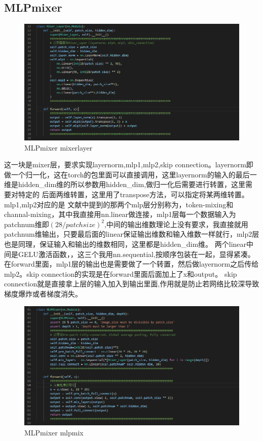 \documentclass{report}
\begin{document}
    \subsection{MLPmixer}
    \begin{figure}[H]
        \centering
        \includegraphics[width=15cm]{13.png}
        \caption{MLPmixer mixerlayer}
    \end{figure}
    这一块是mixer层，要求实现layernorm,mlp1,mlp2,skip connection。layernorm即做一个归一化，这在torch的包里面可以直接调用，这里layernorm的输入的最后一维是hidden\_dim维的所以参数用hidden\_dim,做归一化后需要进行转置，这里需要对特定的
    后面两维转置，这里用了transpose方法，可以指定将某两维转置。mlp1,mlp2对应的是
    文献中提到的那两个mlp层分别称为，token-mixing和channal-mixing，其中我直接用nn.linear做连接，mlp1层每一个数据输入为patchnum维即$(28/patchsize)^2$,中间的输出维数理论上没有要求，我直接就用patchnum维输出，只要最后面的linear保证输出维数和输入维数一样就行，mlp2层也是同理，保证输入和输出的维数相同，这里都是hidden\_dim维。
    两个linear中间是GELU激活函数，，这三个我用nn.sequential,按顺序包装在一起，显得紧凑。在forward里面，mlp1层的输出也是需要做了一个转置，然后做layernorm之后传给mlp2。skip connection的实现是在forward里面后面加上了x和output。
    skip connection就是直接拿上层的输入加入到输出里面,作用就是防止若网络比较深导致梯度爆炸或者梯度消失。\par 
    \begin{figure}[H]
        \centering
        \includegraphics[width=15cm]{14.png}
        \caption{MLPmixer mlpmix}
    \end{figure}
\end{document}
